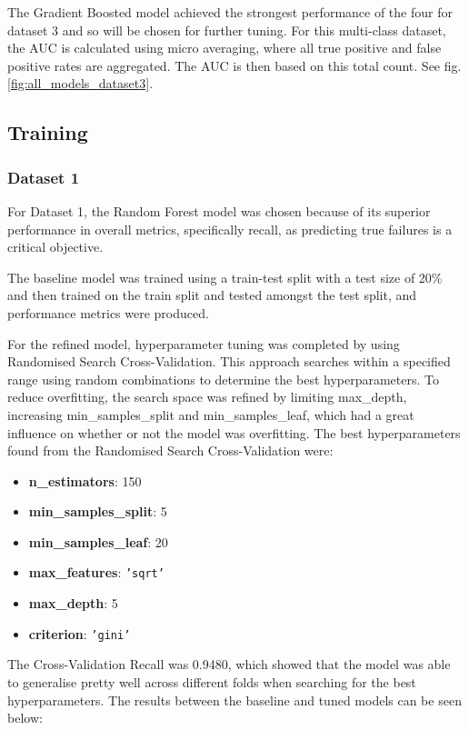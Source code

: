 \documentclass[11pt]{article}
\begin{document}
The Gradient Boosted model achieved the strongest performance of the four for dataset 3 and so will be chosen for further tuning. For this multi-class dataset, the AUC is calculated using micro averaging, where all true positive and false positive rates are aggregated. The AUC is then based on this total count. See fig.\ref{fig:all_models_dataset3}.

\subsection{Training}

\subsubsection{Dataset 1}
For Dataset 1, the Random Forest model was chosen because of its superior performance in overall metrics, specifically recall, as predicting true failures is a critical objective.

The baseline model was trained using a train-test split with a test size of 20\% and then trained on the train split and tested amongst the test split, and performance metrics were produced.  

For the refined model, hyperparameter tuning was completed by using Randomised Search Cross-Validation. This approach searches within a specified range using random combinations to determine the best hyperparameters. To reduce overfitting, the search space was refined by limiting max\_depth, increasing min\_samples\_split and min\_samples\_leaf, which had a great influence on whether or not the model was overfitting. The best hyperparameters found from the Randomised Search Cross-Validation were:

\begin{itemize}
    \item \textbf{n\_estimators}: 150
    \item \textbf{min\_samples\_split}: 5
    \item \textbf{min\_samples\_leaf}: 20
    \item \textbf{max\_features}: \texttt{'sqrt'}
    \item \textbf{max\_depth}: 5
    \item \textbf{criterion}: \texttt{'gini'}
\end{itemize}

The Cross-Validation Recall was 0.9480, which showed that the model was able to generalise pretty well across different folds when searching for the best hyperparameters. The results between the baseline and tuned models can be seen below:
\end{document}
